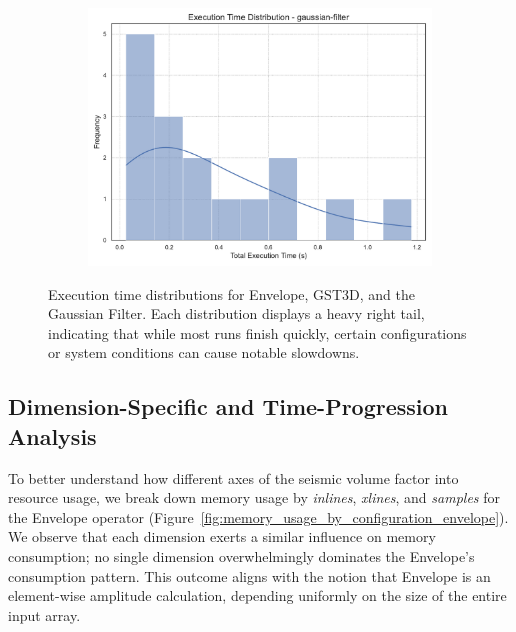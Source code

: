 \begin{figure}[htbp]
\begin{subfigure}[t]{0.49\textwidth}
        \includegraphics[width=\textwidth]{assets/images/05/execution_time_distribution_gaussian-filter}
    \end{subfigure}
    \caption{Execution time distributions for Envelope, \ac{GST3D}, and the Gaussian Filter. Each distribution displays a heavy right tail, indicating that while most runs finish quickly, certain configurations or system conditions can cause notable slowdowns.}
    \label{fig:execution_time_distribution_facet}
\end{figure}

\subsection{Dimension-Specific and Time-Progression Analysis}
\label{subsec:dimension-specific-and-time-progression-analysis}

To better understand how different axes of the seismic volume factor into resource usage, we break down memory usage by \emph{inlines}, \emph{xlines}, and \emph{samples} for the Envelope operator (Figure~\ref{fig:memory_usage_by_configuration_envelope}).
We observe that each dimension exerts a similar influence on memory consumption; no single dimension overwhelmingly dominates the Envelope’s consumption pattern.
This outcome aligns with the notion that Envelope is an element-wise amplitude calculation, depending uniformly on the size of the entire input array.

